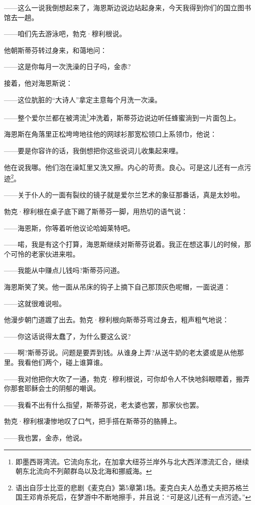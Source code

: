 \par ——这么一说我倒想起来了，海恩斯边说边站起身来，今天我得到你们的国立图书馆去一趟。
\par ——咱们先去游泳吧，勃克·穆利根说。
\par 他朝斯蒂芬转过身来，和蔼地问：
\par ——这是你每月一次洗澡的日子吗，金赤?
\par 接着，他对海恩斯说：
\par ——这位肮脏的“大诗人”拿定主意每个月洗一次澡。
\par ——整个爱尔兰都在被湾流\footnote{即墨西哥湾流。它流向东北，在加拿大纽芬兰岸外与北大西洋漂流汇合，继续朝东北流向不列颠群岛以及北海和挪威海。}冲洗着，斯蒂芬边说边听任蜂蜜淌到一片面包上。
\par 海恩斯在角落里正松垮垮地往他的网球衫那宽松领口上系领巾，他说：
\par ——要是你容许的话，我倒想把你这些说词儿收集起来哩。
\par 他在说我哪。他们泡在澡缸里又洗又擦。内心的苛责。良心。可是这儿还有一点污迹\footnote{语出自莎士比亚的悲剧《麦克白》第5章第1场。麦克白夫人怂恿丈夫把苏格兰国王邓肯杀死后，在梦游中不断地擦手，并且说：“可是这儿还有一点污迹。”}。
\par ——关于仆人的一面有裂纹的镜子就是爱尔兰艺术的象征那番话，真是太妙啦。
\par 勃克·穆利根在桌子底下踢了斯蒂芬一脚，用热切的语气说：
\par ——海恩斯，你等着听他议论哈姆莱特吧。
\par ——喏，我是有这个打算，海恩斯继续对斯蒂芬说着。我正在想这事儿的时候，那个可怜的老家伙进来啦。
\par ——我能从中赚点儿钱吗?斯蒂芬问道。
\par 海恩斯笑了笑。他一面从吊床的钩子上摘下自己那顶灰色呢帽，一面说道：
\par ——这就很难说啦。
\par 他漫步朝门道踱了出去。勃克·穆利根向斯蒂芬弯过身去，粗声粗气地说：
\par ——你这话说得太蠢了，为什么要这么说?
\par ——啊?斯蒂芬说。问题是要弄到钱。从谁身上弄?从送牛奶的老太婆或是从他那里。我看他们两个，碰上谁算谁。
\par ——我对他把你大吹了一通，勃克·穆利根说，可你却令人不快地斜眼瞟着，搬弄你那套耶稣会士的阴郁的嘲讽。
\par ——我看不出有什么指望，斯蒂芬说，老太婆也罢，那家伙也罢。
\par 勃克·穆利根凄惨地叹了口气，把手搭在斯蒂芬的胳膊上。
\par ——我也罢，金赤，他说。
